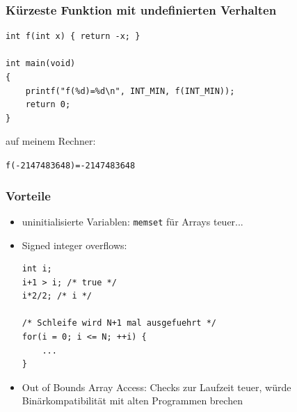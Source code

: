 \documentclass[12pt,compress]{beamer}
\begin{document}

\begin{frame}[fragile]
\frametitle{Kürzeste Funktion mit undefinierten Verhalten}

\begin{lstlisting}
int f(int x) { return -x; }

int main(void)
{
    printf("f(%d)=%d\n", INT_MIN, f(INT_MIN));
    return 0;
}
\end{lstlisting}

\vfill

auf meinem Rechner:

\texttt{f(-2147483648)=-2147483648}

\end{frame}

\begin{frame}[fragile]
\frametitle{Vorteile}

\begin{itemize}
\item uninitialisierte Variablen: \texttt{memset} für Arrays teuer...
\item Signed integer overflows:
\begin{lstlisting}
int i;
i+1 > i; /* true */ 
i*2/2; /* i */

/* Schleife wird N+1 mal ausgefuehrt */
for(i = 0; i <= N; ++i) {
	...
}
\end{lstlisting}
\item Out of Bounds Array Access: Checks zur Laufzeit teuer, würde Binärkompatibilität mit alten Programmen brechen
\end{itemize}
\end{frame}
\end{document}
